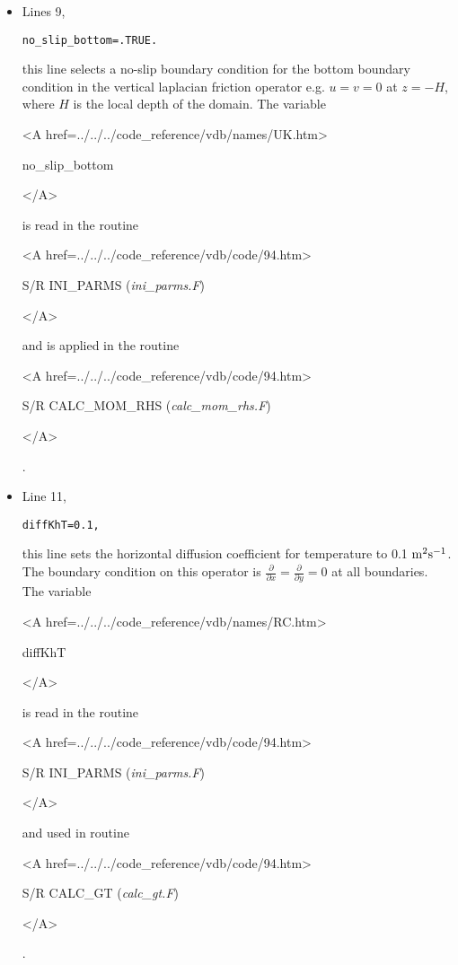 \begin{itemize}
\item Lines 9,
\begin{verbatim}
no_slip_bottom=.TRUE.
\end{verbatim}
this line selects a no-slip boundary condition for the bottom
boundary condition in the vertical laplacian friction operator 
e.g. $u=v=0$ at $z=-H$, where $H$ is the local depth of the domain.
The variable
{\bf
\begin{rawhtml} <A href=../../../code_reference/vdb/names/UK.htm> \end{rawhtml}
no\_slip\_bottom
\begin{rawhtml} </A>\end{rawhtml}
}
is read in the routine
{\it
\begin{rawhtml} <A href=../../../code_reference/vdb/code/94.htm> \end{rawhtml}
S/R INI\_PARMS ({\it ini\_parms.F})
\begin{rawhtml} </A>\end{rawhtml}
} and is applied in the routine 
{\it 
\begin{rawhtml} <A href=../../../code_reference/vdb/code/94.htm> \end{rawhtml}
S/R CALC\_MOM\_RHS ({\it calc\_mom\_rhs.F})
\begin{rawhtml} </A>\end{rawhtml}
}.

\item Line 11,
\begin{verbatim}
diffKhT=0.1,
\end{verbatim}
this line sets the horizontal diffusion coefficient for temperature
to 0.1 $\rm m^{2}s^{-1}$. The boundary condition on this
operator is $\frac{\partial}{\partial x}=\frac{\partial}{\partial y}=0$ at
all boundaries.
The variable
{\bf
\begin{rawhtml} <A href=../../../code_reference/vdb/names/RC.htm> \end{rawhtml}
diffKhT
\begin{rawhtml} </A>\end{rawhtml}
}
is read in the routine
{\it
\begin{rawhtml} <A href=../../../code_reference/vdb/code/94.htm> \end{rawhtml}
S/R INI\_PARMS ({\it ini\_parms.F})
\begin{rawhtml} </A>\end{rawhtml}
} and used in routine 
{\it
\begin{rawhtml} <A href=../../../code_reference/vdb/code/94.htm> \end{rawhtml}
S/R CALC\_GT ({\it calc\_gt.F})
\begin{rawhtml} </A>\end{rawhtml}
}.


\end{itemize}
